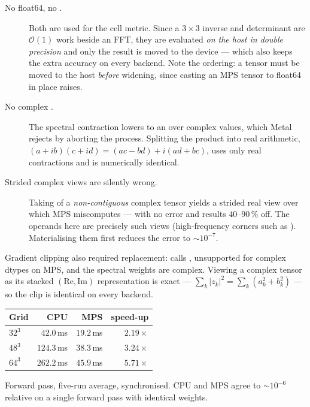\begin{description}
  \item[No float64, no .] Both are used for the cell metric.
    Since a $3\times3$ inverse and determinant are $\mathcal{O}(1)$ work beside
    an FFT, they are evaluated \emph{on the host in double precision} and only
    the result is moved to the device --- which also keeps the extra accuracy
    on every backend. Note the ordering: a tensor must be moved to the host
    \emph{before} widening, since casting an MPS tensor to float64 in place
    raises.
  \item[No complex .] The spectral contraction lowers to an
     over complex values, which Metal rejects by aborting the
    process. Splitting the product into real arithmetic,
    $(a+ib)(c+id) = (ac-bd) + i(ad+bc)$, uses only real contractions and is
    numerically identical.
  \item[Strided complex views are silently wrong.] Taking  of a
    \emph{non-contiguous} complex tensor yields a strided real view over which
    MPS miscomputes  --- with no error and results $40$--$90\,\%$
    off. The operands here are precisely such views (high-frequency corners
    such as ). Materialising them first
    reduces the error to $\sim10^{-7}$.
\end{description}

Gradient clipping also required replacement:  calls
, unsupported for complex dtypes on MPS, and the
spectral weights are complex. Viewing a complex tensor as its stacked
$(\mathrm{Re},\mathrm{Im})$ representation is exact --- $\sum_k|z_k|^2 =
\sum_k(a_k^2+b_k^2)$ --- so the clip is identical on every backend.

\begin{center}
\begin{tabular}{@{}lrrr@{}}
\toprule
Grid & CPU & MPS & speed-up \\
\midrule
$32^3$ & $42.0$\,ms & $19.2$\,ms & $2.19\times$ \\
$48^3$ & $124.3$\,ms & $38.3$\,ms & $3.24\times$ \\
$64^3$ & $262.2$\,ms & $45.9$\,ms & $5.71\times$ \\
\bottomrule
\end{tabular}
\end{center}

Forward pass, five-run average, synchronised. CPU and MPS agree to
$\sim10^{-6}$ relative on a single forward pass with identical weights.

